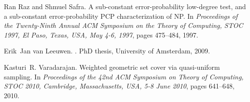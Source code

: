 \documentclass[a4paper,11pt]{article}
\begin{document}
\begin{thebibliography}{10}
Ran Raz and Shmuel Safra.
\newblock A sub-constant error-probability low-degree test, and a sub-constant
  error-probability {PCP} characterization of {NP}.
\newblock In {\em Proceedings of the Twenty-Ninth Annual {ACM} Symposium on the
  Theory of Computing, STOC 1997, El Paso, Texas, USA, May 4-6, 1997}, pages
  475--484, 1997.

Erik~Jan van Leeuwen.
.
\newblock PhD thesis, University of Amsterdam, 2009.

Kasturi~R. Varadarajan.
\newblock Weighted geometric set cover via quasi-uniform sampling.
\newblock In {\em Proceedings of the 42nd {ACM} Symposium on Theory of
  Computing, {STOC} 2010, Cambridge, Massachusetts, USA, 5-8 June 2010}, pages
  641--648, 2010.

\end{thebibliography}
\end{document}
